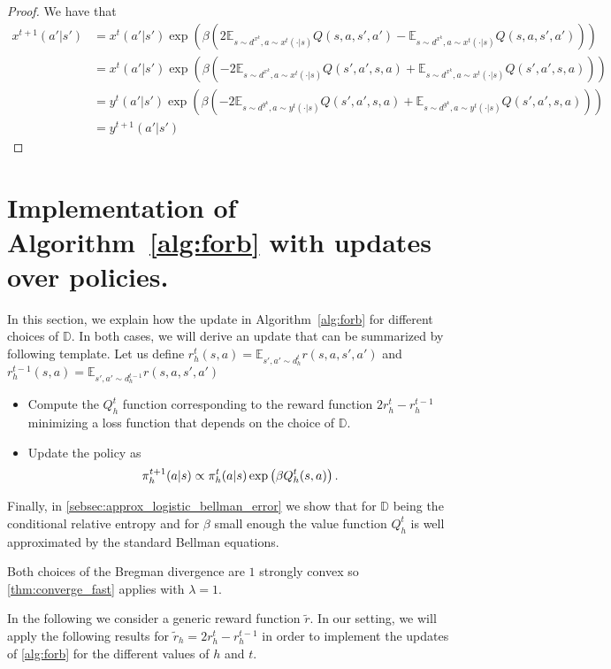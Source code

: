 \begin{proof}
We have that
\begin{align*}
    x^{t+1}(a'|s') &= x^t(a'|s') \exp( \beta(2 \mathbb{E}_{s\sim d^{x^k}, a\sim x^t(\cdot|s)}Q(s,a,s',a') - \mathbb{E}_{s\sim d^{x^k}, a\sim x^t(\cdot|s)}Q(s,a,s',a') )) \\
    &= x^t(a'|s') \exp( \beta(-2 \mathbb{E}_{s\sim d^{x^k}, a\sim x^t(\cdot|s)}Q(s',a',s,a) + \mathbb{E}_{s\sim d^{x^k}, a\sim x^t(\cdot|s)}Q(s',a',s,a) )) \\
    &= y^t(a'|s') \exp( \beta(-2 \mathbb{E}_{s\sim d^{y^k}, a\sim y^t(\cdot|s)}Q(s',a',s,a) + \mathbb{E}_{s\sim d^{y^k}, a\sim y^t(\cdot|s)}Q(s',a',s,a) )) \\
    &= y^{t+1}(a'|s')
\end{align*}
\fi


\end{proof}


\section{Implementation of Algorithm~\ref{alg:forb} with updates over policies.}
\label{app:implement_forb}
In this section, we explain how the update in Algorithm~\ref{alg:forb} for different choices of $\mathbb{D}$. In both cases, we will derive an update that can be summarized by following template.
Let us define $r_{h}^t(s,a) = \mathbb{E}_{s',a' \sim d^t_h} r(s,a,s',a')$ and $r_h^{t-1}(s,a) = \mathbb{E}_{s',a' \sim d^{t-1}_h} r(s,a,s',a')$
\begin{itemize}
    \item Compute the $Q^t_{h}$ function corresponding to the reward function $2r_h^t - r_h^{t-1}$ minimizing a loss function that depends on the choice of $\mathbb{D}$.
    \item Update the policy as 
    \begin{align*}
        \pi^{t+1}_h(a|s) \propto \pi^t_h(a|s) \exp\left({\beta Q^t_{h}(s,a)}\right).
    \end{align*}
\end{itemize}
Finally, in \cref{sebsec:approx_logistic_bellman_error} we show that for $\mathbb{D}$ being the conditional relative entropy and for $\beta$ small enough the value function $Q^t_{h}$ is well approximated by the standard Bellman equations.
\begin{remark}
Both choices of the Bregman divergence are $1$ strongly convex so \cref{thm:converge_fast} applies with $\lambda = 1$.
\end{remark}
In the following we consider a generic reward function $\tilde{r}$. In our setting, we will apply the following results for $\tilde{r}_h = 2r_{h}^t - r_{ h}^{t-1} $ in order to implement the updates of \cref{alg:forb} for the different values of $h$ and $t$.
